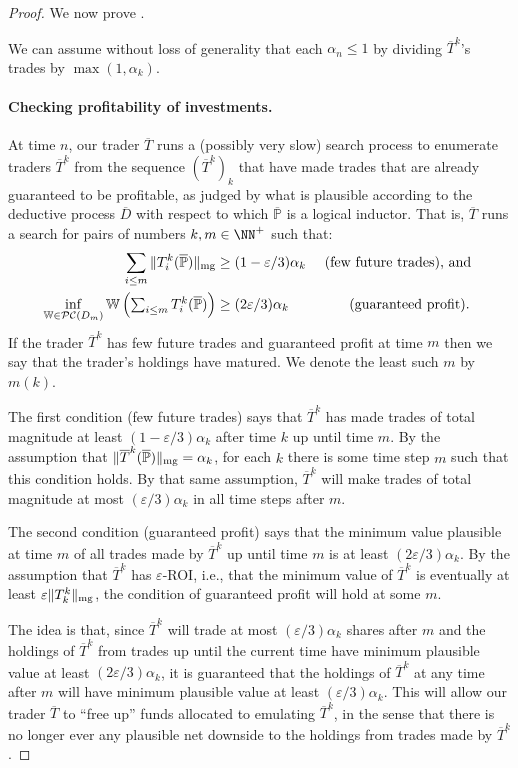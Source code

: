 \documentclass[authordate,onecolumn,noenvironments]{miri-tech-article}
\numberwithin{equation}{subsection}
\newcommand{\seq}[1]{{\overline{#1}}}
\newcommand{\mm}{m}
\newcommand{\li}{logical inductor}
\newcommand{\trade}{T}%
\newcommand{\Trader}{\seq{\trade}} %
\newcommand{\magnit}[1]{{\|#1\|_{\rm mg}}} %
\newcommand{\BelState}{\mathbb{P}}
\newcommand{\pt}{\BelState}
\newcommand{\MP}{\seq{\pt}}
\newcommand{\ftn}{(\MP)} %
\newcommand{\dt}{D}
\newcommand{\DP}{\seq{\dt}}
\newcommand{\pcworlds}{\mathcal{P\-C}}
\newcommand{\World}{\mathbb{W}}
\begin{document}
\newcommand{\opentrades}{\textrm{open}}
\begin{proof}
  We now prove . 
  
  We can assume without loss of generality that each $\alpha_n \leq 1$ by dividing $\Trader^k$'s trades by $\max(1, \alpha_k)$.

\paragraph{Checking profitability of investments.}

At time $n$, our trader $\Trader$ runs a (possibly very slow) search process to enumerate traders $\Trader^k$ 
from the sequence $(\Trader^k)_k$ that have made trades that are already guaranteed to be profitable, as judged by what is plausible according to the deductive process $\DP$ with respect to which $\MP$ is a \li{}. 
That is, $\Trader$ runs a search for 
pairs of numbers  $k, m\in\NN^+$ such that:
%
\begin{align*}
\sum_{i \leq m} \magnit{\trade^k_i(\MP)} &\geq (1 - \varepsilon/3) \alpha_k  &\textrm{ (few future trades), and } \\
\inf_{\World\in\pcworlds(\dt_\mm)}\World \left( {\textstyle \sum_{i \leq m}  \trade^k_i(\MP)
 }\right) &\geq (2\varepsilon /3) \alpha_k & \textrm{ (guaranteed profit). }
\end{align*}
%
If the trader $\Trader^k$ has few future
trades and guaranteed profit at time $m$ then  we say that the trader's holdings have matured. We denote the least such $m$ by $m(k)$. 

The first condition (few future trades)  says that $\Trader^k$ has made trades of total magnitude at least $(1 - \varepsilon/3) \alpha_k$ after time $k$ up until time $m$. By the assumption that $ \magnit{\Trader^k \ftn}= \alpha_k$, for each $k$ there is some time step $m$ such that this condition holds. By that same assumption, $\Trader^k$ will make trades of total magnitude at most $(\varepsilon/3)\alpha_k$ in all time steps after $m$. 

The second condition (guaranteed profit) says that the minimum value plausible at time $m$ of all trades made by $\Trader^k$ up until time $m$ is at
least $(2\varepsilon /3) \alpha_k$. By the assumption that $\Trader^k$ has $\varepsilon$-ROI, i.e., that the minimum 
value of $\Trader^k$ is eventually at least $\varepsilon \magnit{\trade^k_k}$, the condition of guaranteed profit will hold at some $m$. 

The idea is that, since $\Trader^k$ will  trade at most $(\varepsilon/3) \alpha_k$ shares after
$m$ and the holdings of $\Trader^k$ from trades up until the current time have minimum plausible value at least $(2\varepsilon /3) \alpha_k$,
it is guaranteed that  the holdings of 
$\Trader^k$ at any time after $m$ will have minimum plausible value at least $(\varepsilon/3) \alpha_k$. This will allow our trader $\Trader$ to ``free up''
funds allocated to emulating $\Trader^k$, in the sense that there is no longer ever any plausible net downside to the holdings from trades made by $\Trader^k$. 



\end{proof}
\end{document}
